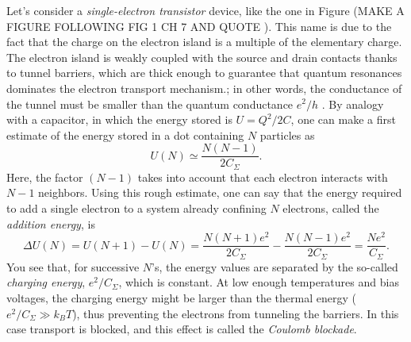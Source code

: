 \documentclass[a4paper,twoside,11pt]{book}
\begin{document}
Let's consider a \emph{single-electron transistor} device, like the one in Figure (MAKE A FIGURE FOLLOWING FIG 1 CH 7 AND QUOTE \cite{Fasth2007}). This name is due to the fact that the charge on the electron island is a multiple of the elementary charge. The electron island is weakly coupled with the source and drain contacts thanks to tunnel barriers, which are thick enough to guarantee that quantum resonances dominates the electron transport mechanism.; in other words, the conductance of the tunnel must be smaller than the quantum conductance $e^2/h$ \citep[see][]{Reimann2002}. By analogy with a capacitor, in which the energy stored is $U=Q^2/2C$, one can make a first estimate of the energy stored in a dot containing $N$ particles as
\begin{equation}
	U(N) \simeq \frac{N(N-1)}{2C_{\Sigma}}.
\end{equation}
Here, the factor $(N-1)$ takes into account that each electron interacts with $N-1$ neighbors. Using this rough estimate, one can say that the energy required to add a single electron to a system already confining $N$ electrons, called the \emph{addition energy}, is
\begin{equation}
	\Delta U (N) = U(N+1)-U(N) = \frac{N(N+1)e^2}{2C_{\Sigma}} - \frac{N(N-1)e^2}{2C_{\Sigma}} = \frac{Ne^2}{C_{\Sigma}}.
\end{equation}
You see that, for successive $N$'s, the energy values are separated by the so-called \emph{charging energy}, $e^2/C_{\Sigma}$, which is constant. At low enough temperatures and bias voltages, the charging energy might be larger than the thermal energy ($e^2/C_{\Sigma} \gg k_BT$), thus preventing the electrons from tunneling the barriers. In this case transport is blocked, and this effect is called the \emph{Coulomb blockade}.
\end{document}
